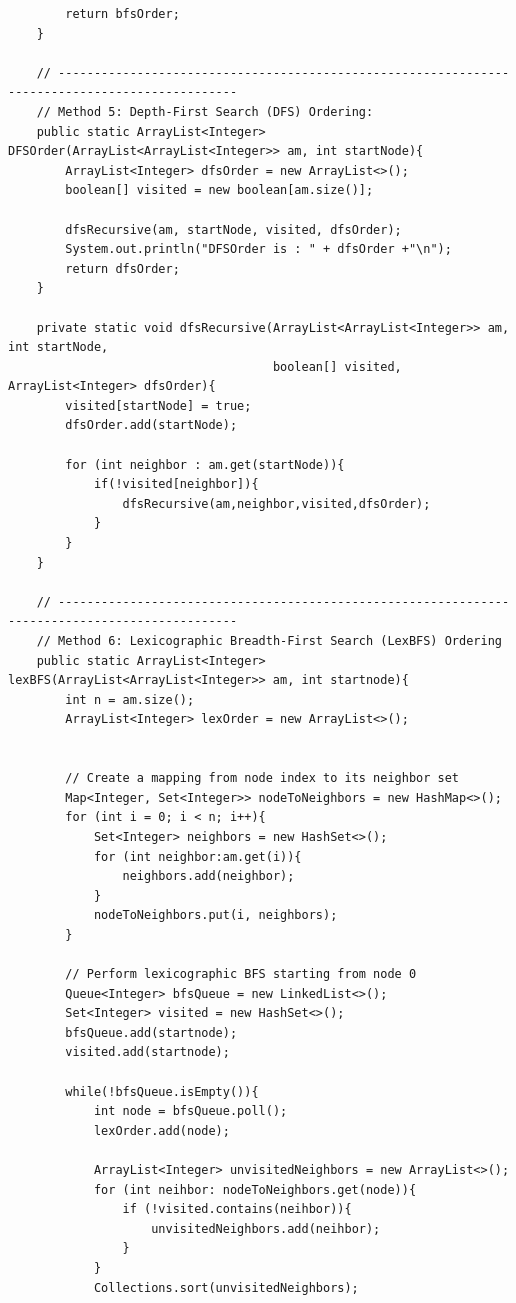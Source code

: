 \documentclass{article}
\begin{document}
\begin{verbatim}
        return bfsOrder;
    }

    // -----------------------------------------------------------------------------------------------
    // Method 5: Depth-First Search (DFS) Ordering:
    public static ArrayList<Integer> DFSOrder(ArrayList<ArrayList<Integer>> am, int startNode){
        ArrayList<Integer> dfsOrder = new ArrayList<>();
        boolean[] visited = new boolean[am.size()];

        dfsRecursive(am, startNode, visited, dfsOrder);
        System.out.println("DFSOrder is : " + dfsOrder +"\n");
        return dfsOrder;
    }

    private static void dfsRecursive(ArrayList<ArrayList<Integer>> am, int startNode,
                                     boolean[] visited, ArrayList<Integer> dfsOrder){
        visited[startNode] = true;
        dfsOrder.add(startNode);

        for (int neighbor : am.get(startNode)){
            if(!visited[neighbor]){
                dfsRecursive(am,neighbor,visited,dfsOrder);
            }
        }
    }

    // -----------------------------------------------------------------------------------------------
    // Method 6: Lexicographic Breadth-First Search (LexBFS) Ordering
    public static ArrayList<Integer> lexBFS(ArrayList<ArrayList<Integer>> am, int startnode){
        int n = am.size();
        ArrayList<Integer> lexOrder = new ArrayList<>();


        // Create a mapping from node index to its neighbor set
        Map<Integer, Set<Integer>> nodeToNeighbors = new HashMap<>();
        for (int i = 0; i < n; i++){
            Set<Integer> neighbors = new HashSet<>();
            for (int neighbor:am.get(i)){
                neighbors.add(neighbor);
            }
            nodeToNeighbors.put(i, neighbors);
        }

        // Perform lexicographic BFS starting from node 0
        Queue<Integer> bfsQueue = new LinkedList<>();
        Set<Integer> visited = new HashSet<>();
        bfsQueue.add(startnode);
        visited.add(startnode);

        while(!bfsQueue.isEmpty()){
            int node = bfsQueue.poll();
            lexOrder.add(node);

            ArrayList<Integer> unvisitedNeighbors = new ArrayList<>();
            for (int neihbor: nodeToNeighbors.get(node)){
                if (!visited.contains(neihbor)){
                    unvisitedNeighbors.add(neihbor);
                }
            }
            Collections.sort(unvisitedNeighbors);


\end{verbatim}
\end{document}
